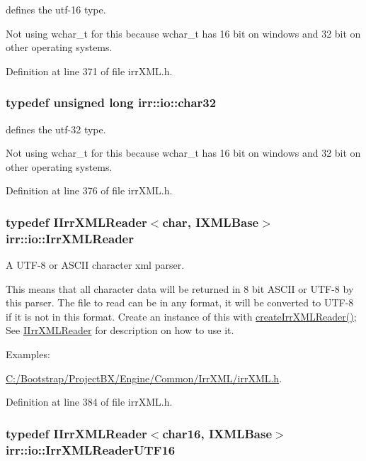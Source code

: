 defines the utf-16 type. 

Not using wchar\_\-t for this because wchar\_\-t has 16 bit on windows and 32 bit on other operating systems. 

Definition at line 371 of file irrXML.h.\hypertarget{namespaceirr_1_1io_ab102cb4e8212cf98c1561064eb36e9e}{
\subsubsection[{char32}]{\setlength{\rightskip}{0pt plus 5cm}typedef unsigned long {\bf irr::io::char32}}}
\label{namespaceirr_1_1io_ab102cb4e8212cf98c1561064eb36e9e}


defines the utf-32 type. 

Not using wchar\_\-t for this because wchar\_\-t has 16 bit on windows and 32 bit on other operating systems. 

Definition at line 376 of file irrXML.h.\hypertarget{namespaceirr_1_1io_1628edbb9d5d53f18c82d2a92b0ad27e}{
\subsubsection[{IrrXMLReader}]{\setlength{\rightskip}{0pt plus 5cm}typedef {\bf IIrrXMLReader}$<$char, {\bf IXMLBase}$>$ {\bf irr::io::IrrXMLReader}}}
\label{namespaceirr_1_1io_1628edbb9d5d53f18c82d2a92b0ad27e}


A UTF-8 or ASCII character xml parser. 

This means that all character data will be returned in 8 bit ASCII or UTF-8 by this parser. The file to read can be in any format, it will be converted to UTF-8 if it is not in this format. Create an instance of this with \hyperlink{namespaceirr_1_1io_a79dd5b9dae1b75be3dec4374176a5ce}{createIrrXMLReader()}; See \hyperlink{classirr_1_1io_1_1_i_irr_x_m_l_reader}{IIrrXMLReader} for description on how to use it. \begin{Desc}
\item[Examples: ]\par
\hyperlink{_c_1_2_bootstrap_2_project_b_x_2_engine_2_common_2_irr_x_m_l_2irr_x_m_l_8h-example}{C:/Bootstrap/ProjectBX/Engine/Common/IrrXML/irrXML.h}.\end{Desc}


Definition at line 384 of file irrXML.h.\hypertarget{namespaceirr_1_1io_5eb4094dfd0d509e0cd8a9d1dd30a5b9}{
\subsubsection[{IrrXMLReaderUTF16}]{\setlength{\rightskip}{0pt plus 5cm}typedef {\bf IIrrXMLReader}$<${\bf char16}, {\bf IXMLBase}$>$ {\bf irr::io::IrrXMLReaderUTF16}}}
\label{namespaceirr_1_1io_5eb4094dfd0d509e0cd8a9d1dd30a5b9}


